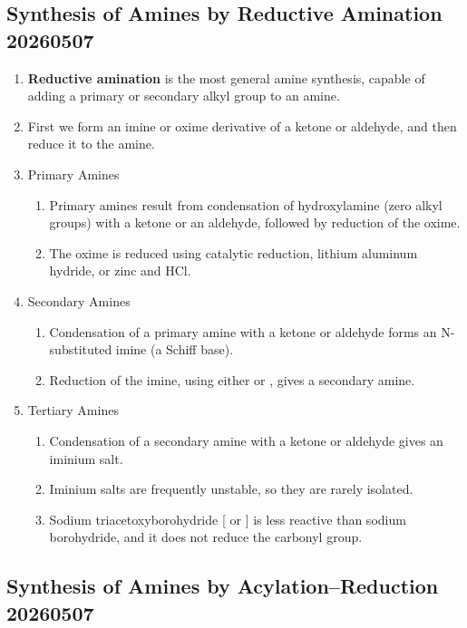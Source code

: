 \subsection{Synthesis of Amines by Reductive Amination 20260507}

\begin{enumerate}
    \item \textbf{Reductive amination} is the most general amine synthesis, capable of adding a primary or secondary alkyl group to an amine.
    \item First we form an imine or oxime derivative of a ketone or aldehyde, and then reduce it to the amine.
    \item Primary Amines
    \begin{enumerate}
        \item Primary amines result from condensation of hydroxylamine (zero alkyl groups) with a ketone or an aldehyde, followed by reduction of the oxime.
        \item The oxime is reduced using catalytic reduction, lithium aluminum hydride, or zinc and HCl.
    \end{enumerate}
    \item Secondary Amines
    \begin{enumerate}
        \item Condensation of a primary amine with a ketone or aldehyde forms an N-substituted imine (a Schiff base).
        \item Reduction of the imine, using either  or , gives a secondary amine.
    \end{enumerate}
    \item Tertiary Amines
    \begin{enumerate}
        \item Condensation of a secondary amine with a ketone or aldehyde gives an iminium salt.
        \item Iminium salts are frequently unstable, so they are rarely isolated.
        \item Sodium triacetoxyborohydride [ or ] is less reactive than sodium borohydride, and it does not reduce the carbonyl group.
    \end{enumerate}
\end{enumerate}

\subsection{Synthesis of Amines by Acylation–Reduction 20260507}

